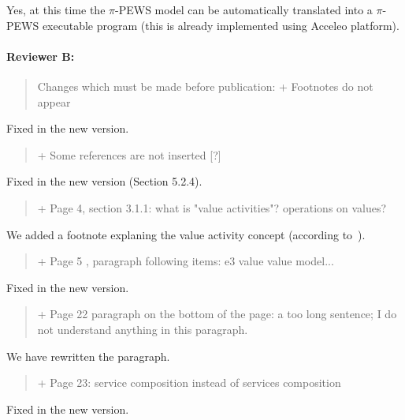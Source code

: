 \documentclass[12pt,a4wide]{article}
\begin{document}
 
 Yes, at this time the $\pi$-PEWS model can be automatically translated into a $\pi$-PEWS executable program (this is already implemented using Acceleo platform).
 
\paragraph*{Reviewer B:} 
\begin{quotation}\sf\footnotesize

Changes which must be made before publication: 
+ Footnotes do not appear 
\end{quotation}

\noindent 
Fixed in the new version.


\begin{quotation}\sf\footnotesize

+ Some references are not inserted [?] 
\end{quotation}

\noindent 
Fixed in the new version (Section 5.2.4).

\begin{quotation}\sf\footnotesize

+ Page 4, section 3.1.1: what is "value activities"? operations on values? 
\end{quotation}

\noindent 
We added a footnote explaning the value activity concept (according to~\cite{Gordijn02valuebased}).

\begin{quotation}\sf\footnotesize

+ Page 5 , paragraph following items: e3 value value model... 
\end{quotation}

\noindent 
Fixed in the new version.

\begin{quotation}\sf\footnotesize

+ Page 22 paragraph on the bottom of the page: a too long sentence; I do not understand anything in this paragraph. 
\end{quotation}

\noindent 
We have rewritten the paragraph.

\begin{quotation}\sf\footnotesize

+ Page 23: service composition instead of services composition 
\end{quotation}

\noindent 
Fixed in the new version.
\end{document}

